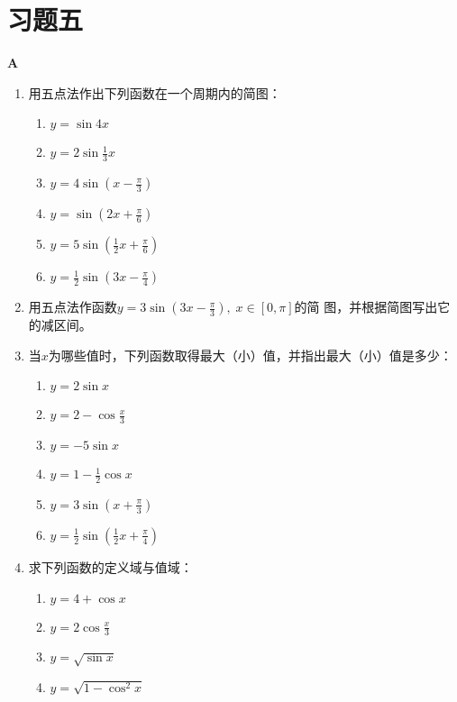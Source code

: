 \section*{习题五}
\begin{center}
    \bfseries A
\end{center}
\begin{enumerate}
    \item 用五点法作出下列函数在一个周期内的简图：
\begin{multicols}{2}
\begin{enumerate}[(1)]
    \item $y=\sin 4x$
    \item $y=2\sin \frac{1}{3}x$
    \item $y=4\sin\left(x-\frac{\pi}{3}\right) $
    \item $y=\sin \left(2x+\frac{\pi}{6}\right)$
    \item $y=5\sin\left(\frac{1}{2}x+\frac{\pi}{6}\right) $
    \item $y=\frac{1}{2}\sin \left(3x-\frac{\pi}{4}\right)$
\end{enumerate}
\end{multicols}
\item 用五点法作函数$y=3\sin\left(3x-\frac{\pi}{3}\right),\; x\in[0,\pi]$的简
图，并根据简图写出它的减区间。
\item 当$x$为哪些值时，下列函数取得最大（小）值，并指出最大（小）值是多少：
\begin{multicols}{2}
\begin{enumerate}[(1)]
    \item $y=2\sin x$
    \item $y=2-\cos\frac{x}{3}$
    \item $y=-5\sin x$
    \item $y=1-\frac{1}{2}\cos x$
    \item $y=3\sin\left(x+\frac{\pi}{3}\right)$
    \item $y=\frac{1}{2}\sin\left(\frac{1}{2}x+\frac{\pi}{4}\right)$
\end{enumerate}
\end{multicols}

\item 求下列函数的定义域与值域：
\begin{multicols}{2}
\begin{enumerate}[(1)]
    \item $y=4+\cos x$
    \item $y=2\cos\frac{x}{3}$
    \item $y=\sqrt{\sin x}$
    \item $y=\sqrt{1-\cos^2 x}$
\end{enumerate}
\end{multicols}
\end{enumerate}

